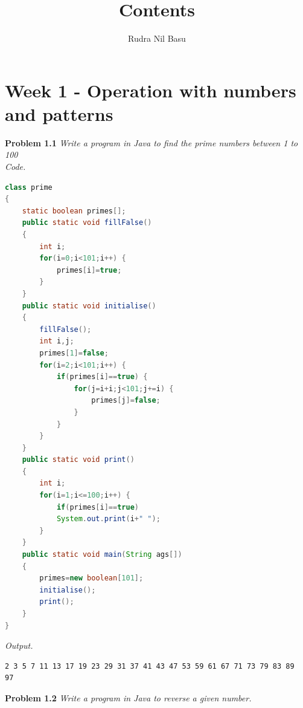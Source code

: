 \documentclass[12pt]{article}
\title{Contents}
\author{Rudra Nil Basu}
\date{ }
\begin{document}
\maketitle
\tableofcontents

\newpage

\setlength{\fboxrule}{.5mm}\setlength{\fboxsep}{1.2mm}
\newlength{\boxlength}\setlength{\boxlength}{\textwidth}
\addtolength{\boxlength}{-4mm}
\begin{center}\end{center}
\vspace{5mm}

\section{Week 1 - Operation with numbers and patterns}


\textbf{Problem 1.1} \textit{Write a program in Java to find the prime numbers between 1 to 100}\\


\textit{Code.}



\begin{lstlisting}[language=Java]
class prime
{
	static boolean primes[];
	public static void fillFalse()
	{
		int i;
		for(i=0;i<101;i++) {
			primes[i]=true;
		}
	}
	public static void initialise()
	{
		fillFalse();
		int i,j;
		primes[1]=false;
		for(i=2;i<101;i++) {
			if(primes[i]==true) {
				for(j=i+i;j<101;j+=i) {
					primes[j]=false;
				}
			}
		}
	}
	public static void print()
	{
		int i;
		for(i=1;i<=100;i++) {
			if(primes[i]==true)
			System.out.print(i+" ");
		}
	}
	public static void main(String ags[])
	{
		primes=new boolean[101];
		initialise();
		print();
	}
}
\end{lstlisting}

\textit{Output.}
\begin{lstlisting}
2 3 5 7 11 13 17 19 23 29 31 37 41 43 47 53 59 61 67 71 73 79 83 89 
97 
\end{lstlisting}

\textbf{Problem 1.2} \textit{Write a program in Java to reverse a given number.}\\
\end{document}
